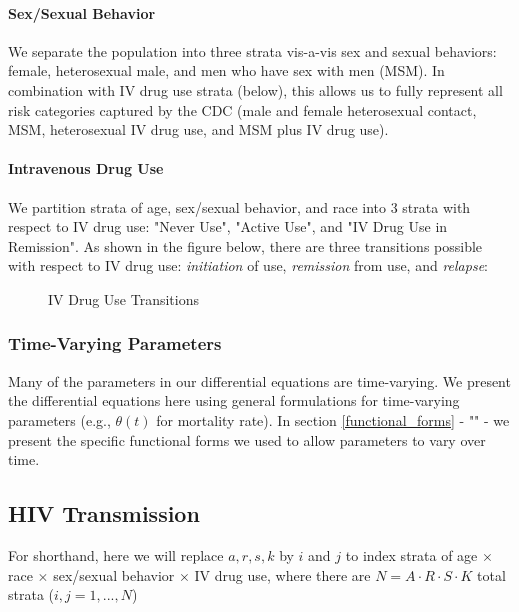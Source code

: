 \documentclass{article}
\begin{document}
\paragraph{Sex/Sexual Behavior} We separate the population into three strata vis-a-vis sex and sexual behaviors: female, heterosexual male, and men who have sex with men (MSM). In combination with IV drug use strata (below), this allows us to fully represent all risk categories captured by the CDC (male and female heterosexual contact, MSM, heterosexual IV drug use, and MSM plus IV drug use).

\paragraph{Intravenous Drug Use}

We partition strata of age, sex/sexual behavior, and race into 3 strata with respect to IV drug use: "Never Use", "Active Use", and "IV Drug Use in Remission". As shown in the figure below, there are three transitions possible with respect to IV drug use: \textit{initiation} of use, \textit{remission} from use, and \textit{relapse}:

\begin{figure}[H]
	\caption{IV Drug Use Transitions}
	\centering
\end{figure}

\subsubsection{Time-Varying Parameters}

Many of the parameters in our differential equations are time-varying. We present the differential equations here using general formulations for time-varying parameters (e.g., $\theta(t)$ for mortality rate). In section \ref{functional_forms} - "" - we present the specific functional forms we used to allow parameters to vary over time. 


\subsection{HIV Transmission}\label{transmission}

For shorthand, here we will replace $a,r,s,k$ by $i$ and $j$ to index strata of age $\times$ race $\times$ sex/sexual behavior $\times$ IV drug use, where there are $N=A\cdot R \cdot S \cdot K$ total strata ($i,j = 1, ..., N$)
\newline
\newline
\end{document}
